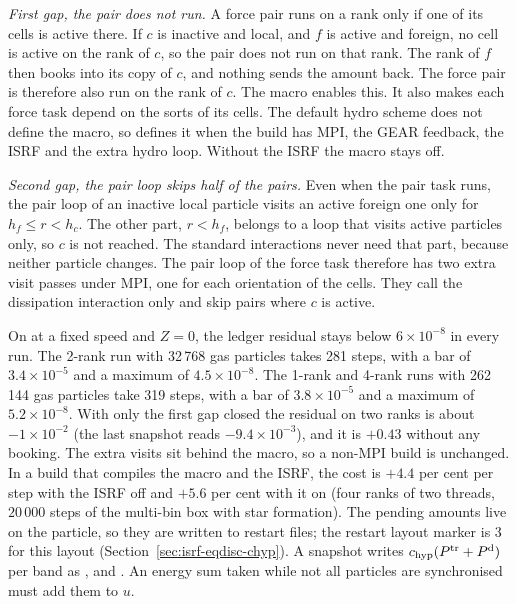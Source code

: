 \emph{First gap, the pair does not run.} A force pair runs on a rank only if
one of its cells is active there. If $c$ is inactive and local, and $f$ is
active and foreign, no cell is active on the rank of $c$, so the pair does not
run on that rank. The rank of $f$ then books into its copy of $c$, and nothing
sends the amount back. The force pair is therefore also run on the rank of
$c$. The macro  enables this. It also
makes each force task depend on the sorts of its cells. The default hydro scheme does not define the
macro, so  defines it when the build has MPI, the GEAR feedback,
the ISRF and the extra hydro loop. Without the ISRF the macro stays off.

\emph{Second gap, the pair loop skips half of the pairs.} Even when the pair
task runs, the pair loop of an inactive local particle visits an active foreign
one only for $h_f \le r < h_c$. The other part, $r < h_f$, belongs to a loop
that visits active particles only, so $c$ is not reached. The standard
interactions never need that part, because neither particle changes. The pair
loop of the force task therefore has two extra visit passes under MPI, one for
each orientation of the cells. They call the dissipation interaction only and
skip pairs where $c$ is active.

On  at a fixed speed and $Z = 0$, the ledger
residual stays below $6\times10^{-8}$ in every run. The 2-rank run with 32\,768
gas particles takes 281 steps, with a bar of $3.4\times10^{-5}$ and a maximum
of $4.5\times10^{-8}$. The 1-rank and 4-rank runs with 262\,144 gas particles
take 319 steps, with a bar of $3.8\times10^{-5}$ and a maximum of
$5.2\times10^{-8}$. With only the first gap closed the residual on two ranks
is about $-1\times10^{-2}$ (the last snapshot reads $-9.4\times10^{-3}$), and
it is $+0.43$ without any booking. The
extra visits sit behind the macro, so a non-MPI build is unchanged. In a
build that compiles the macro and the ISRF, the cost is $+4.4$ per cent per
step with the ISRF off and $+5.6$ per cent with it on (four ranks
of two threads, $20\,000$ steps of the multi-bin box with star formation).
The pending amounts
live on the particle, so they are written to restart files; the restart
layout marker is 3 for this layout (Section~\ref{sec:isrf-eqdisc-chyp}). A
snapshot writes $c_{\rm hyp}(P^{\rm tr} + P^{\rm d})$ per band as
,  and
. An energy sum taken while not all
particles are synchronised must add them to $u$.

